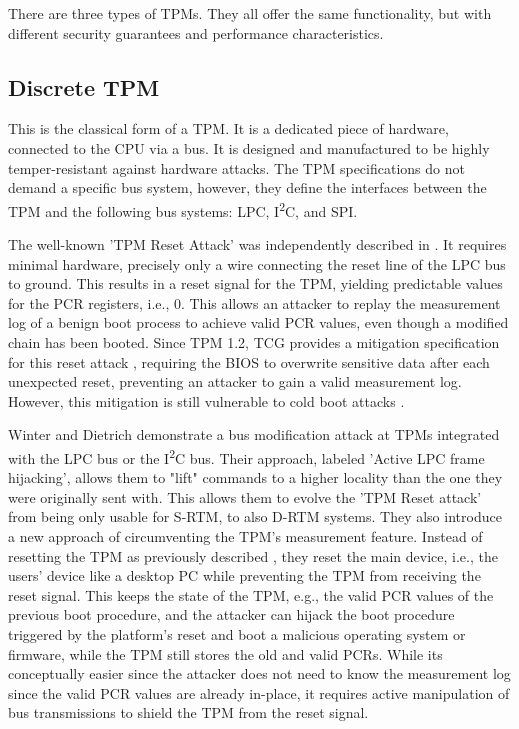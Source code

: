 There are three types of TPMs. They all offer the same functionality, but with different security guarantees and performance characteristics.

\subsection{Discrete TPM}

This is the classical form of a TPM. It is a dedicated piece of hardware, connected to the CPU via a bus. It is designed and manufactured to be highly temper-resistant against hardware attacks.
The TPM specifications \cite{tpm, tcgPcClient} do not demand a specific bus system, however, they define the interfaces between the TPM and the following bus systems: LPC, I\textsuperscript{2}C, and SPI.

The well-known 'TPM Reset Attack' was independently described in \cite{kauerBernhard,sparks2007}. It requires minimal hardware, precisely only a wire connecting the reset line of the LPC bus \cite{lpc} to ground. This results in a reset signal for the TPM, yielding predictable values for the \ac{PCR} registers, i.e., 0. This allows an attacker to replay the measurement log of a benign boot process to achieve valid \ac{PCR} values, even though a modified chain has been booted.
Since TPM 1.2, TCG provides a mitigation specification for this reset attack \cite{tcgResetFix}, requiring the BIOS to overwrite sensitive data after each unexpected reset, preventing an attacker to gain a valid measurement log.
However, this mitigation is still vulnerable to cold boot attacks \cite{Halderman2009, Winter2013}.

Winter and Dietrich \cite{Winter2013} demonstrate a bus modification attack at TPMs integrated with the LPC bus or the I\textsuperscript{2}C bus.
Their approach, labeled 'Active LPC frame hijacking', allows them to "lift" commands to a higher locality than the one they were originally sent with. This allows them to evolve the 'TPM Reset attack' from being only usable for S-RTM, to also D-RTM systems.
They also introduce a new approach of circumventing the TPM's measurement feature. Instead of resetting the TPM as previously described \cite{kauerBernhard,sparks2007}, they reset the main device, i.e., the users' device like a desktop PC while preventing the TPM from receiving the reset signal. This keeps the state of the TPM, e.g., the valid \ac{PCR} values of the previous boot procedure, and the attacker can hijack the boot procedure triggered by the platform's reset and boot a malicious operating system or firmware, while the TPM still stores the old and valid PCRs. While its conceptually easier since the attacker does not need to know the measurement log since the valid \ac{PCR} values are already in-place, it requires active manipulation of bus transmissions to shield the TPM from the reset signal.

